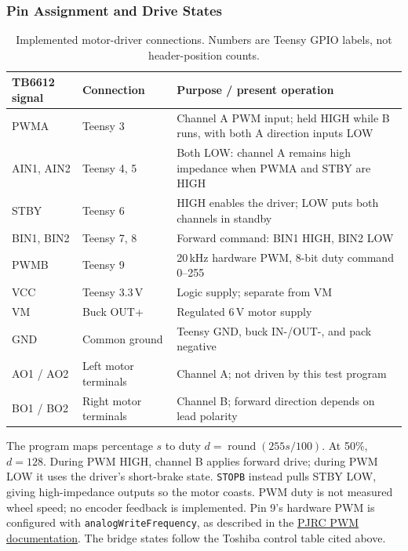 \subsubsection{Pin Assignment and Drive States}
\begin{table}[H]
\centering\small
\caption{Implemented motor-driver connections. Numbers are Teensy GPIO labels, not header-position counts.}
\label{tab:motor-prototype-pins}
\begin{tabular}{@{}L{2.4cm}L{3.6cm}L{9.8cm}@{}}
\toprule
\textbf{TB6612 signal} & \textbf{Connection} & \textbf{Purpose / present operation} \\
\midrule
PWMA & Teensy 3 & Channel A PWM input; held HIGH while B runs, with both A direction inputs LOW \\
AIN1, AIN2 & Teensy 4, 5 & Both LOW: channel A remains high impedance when PWMA and STBY are HIGH \\
STBY & Teensy 6 & HIGH enables the driver; LOW puts both channels in standby \\
BIN1, BIN2 & Teensy 7, 8 & Forward command: BIN1 HIGH, BIN2 LOW \\
PWMB & Teensy 9 & 20\,kHz hardware PWM, 8-bit duty command 0--255 \\
VCC & Teensy 3.3\,V & Logic supply; separate from VM \\
VM & Buck OUT+ & Regulated 6\,V motor supply \\
GND & Common ground & Teensy GND, buck IN-/OUT-, and pack negative \\
AO1 / AO2 & Left motor terminals & Channel A; not driven by this test program \\
BO1 / BO2 & Right motor terminals & Channel B; forward direction depends on lead polarity \\
\bottomrule
\end{tabular}
\end{table}

The program maps percentage $s$ to duty $d=\operatorname{round}(255s/100)$. At 50\%, $d=128$. During PWM HIGH, channel B applies forward drive; during PWM LOW it uses the driver's short-brake state. \texttt{STOPB} instead pulls STBY LOW, giving high-impedance outputs so the motor coasts. PWM duty is not measured wheel speed; no encoder feedback is implemented. Pin 9's hardware PWM is configured with \texttt{analogWriteFrequency}, as described in the \href{https://www.pjrc.com/teensy/td_pulse.html}{PJRC PWM documentation}. The bridge states follow the Toshiba control table cited above.

